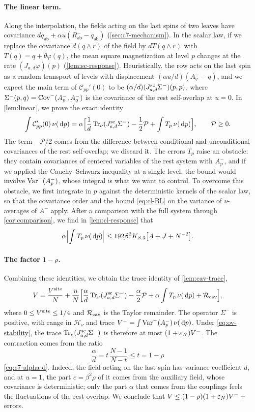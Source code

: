 \paragraph{The linear term.}
Along the interpolation, the fields acting on the last spins of two
leaves have covariance
$dq_{\mathsf{ab}}+\alpha u(R^-_{\mathsf{ab}}-q_{\mathsf{ab}})$
(\cref{sec:c7-mechanism}). In the scalar law, if we replace the covariance $d(q\wedge r)$ of the
field by $dT(q\wedge r)$ with $T(q)=q+\theta\varphi(q)$, the mean square
magnetization at level $p$ changes at the rate $(J_{a,d}\varphi)(p)$
(\cref{lem:sc-response}). Heuristically, the row acts on the last spin
as a random transport of levels with displacement
$(\alpha u/d)(A^-_q-q)$, and we expect the main term of
$\mathcal C_{pp}'(0)$ to be $(\alpha/d)(J^{\mathrm{sc}}_{a,d}\Sigma^-)(p,p)$,
where $\Sigma^-(p,q)=\operatorname{Cov}^-(A^-_p,A^-_q)$ is the covariance of the rest
self-overlap at $u=0$. In \cref{lem:linear}, we prove the exact
identity
\[
 \int\mathcal C_{pp}'(0)\,\nu(\,\mathrm d p)
 =\alpha\Bigl[\frac1d\operatorname{Tr}_\nu(J^{\mathrm{sc}}_{a,d}\Sigma^-)-\frac12\mathcal P
 +\int T_p\,\nu(\,\mathrm d p)\Bigr],\qquad\mathcal P\ge0 .
\]
The term $-\mathcal P/2$ comes from the difference between conditional
and unconditional covariances of the rest self-overlap; we discard
it. The errors $T_p$ raise an obstacle: they contain covariances of
centered variables of the rest system with $A^-_p$, and if we applied the
Cauchy--Schwarz inequality at a single level, the bound would involve
$\operatorname{Var}^-(A^-_p)$, whose integral is what we want to control. To overcome this obstacle, we first integrate in $p$ against
the deterministic kernels of the scalar law, so that the covariance
order and the bound \eqref{eq:cl-BL} on the variance of $\nu$-averages
of $A^-$ apply. After a comparison with the full system through
\cref{cor:comparison}, we find in \cref{lem:cl-response} that
\[
 \alpha\Bigl|\int T_p\,\nu(\,\mathrm d p)\Bigr|
 \le192\beta^2K_{\beta,3}\bigl[A+J+N^{-2}\bigr].
\]

\paragraph{\texorpdfstring{The factor $1-\rho$.}{The factor 1-rho.}}
Combining these identities, we obtain the trace identity of
\cref{lem:cav-trace},
\[
 V=\frac{V^{\rm site}}N+\frac nN\Bigl[
 \frac\alpha d\operatorname{Tr}_\nu(J^{\mathrm{sc}}_{a,d}\Sigma^-)
 -\frac\alpha2\mathcal P+\alpha\int T_p\,\nu(\,\mathrm d p)
 +\mathcal R_{\rm cav}\Bigr],
\]
where $0\le V^{\rm site}\le1/4$ and $\mathcal R_{\rm cav}$ is the Taylor
remainder. The operator $\Sigma^-$ is positive, with range in
$\mathcal H_\nu$ and trace $V^-=\int\operatorname{Var}^-(A^-_p)\,\nu(\,\mathrm d p)$. Under
\eqref{eq:ov-stability}, the trace $\operatorname{Tr}_\nu(J^{\mathrm{sc}}_{a,d}\Sigma^-)$ is
therefore at most $(1+\varepsilon_N)V^-$. The contraction comes from the ratio
\[
 \frac\alpha d=t\,\frac{N-1}{N-t}\le t=1-\rho
\]
\eqref{eq:c7-alpha-d}. Indeed, the field acting on the last spin has
variance coefficient $d$, and at $u=1$, the part $c=\beta^2\rho$ of it
comes from the auxiliary field, whose covariance is deterministic; only
the part $\alpha$ that comes from the couplings feels the fluctuations
of the rest overlap. We conclude that
$V\le(1-\rho)(1+\varepsilon_N)V^-+{}$errors.

